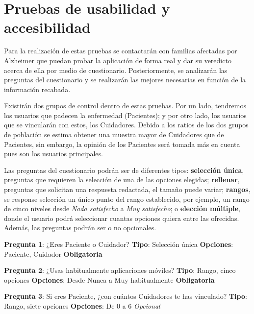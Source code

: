 \section{Pruebas de usabilidad y accesibilidad}
\label{sec:usabilidad_accesibilidad}

Para la realización de estas pruebas se contactarán con familias afectadas por Alzheimer que puedan probar la aplicación de forma real y dar su veredicto acerca de ella por medio de cuestionario. Posteriormente, se analizarán las preguntas del cuestionario y se realizarán las mejores necesarias en función de la información recabada.

Existirán dos grupos de control dentro de estas pruebas. Por un lado, tendremos los usuarios que padecen la enfermedad (Pacientes); y por otro lado, los usuarios que se vincularán con estos, los Cuidadores. Debido a los ratios de los dos grupos de población se estima obtener una muestra mayor de Cuidadores que de Pacientes, sin embargo, la opinión de los Pacientes será tomada más en cuenta pues son los usuarios principales.

Las preguntas del cuestionario podrán ser de diferentes tipos: \textbf{selección única}, preguntas que requieren la selección de una de las opciones elegidas; \textbf{rellenar}, preguntas que solicitan una respuesta redactada, el tamaño puede variar; \textbf{rangos}, se response selección un único punto del rango establecido, por ejemplo, un rango de cinco niveles desde \emph{Nada satisfecho} a \emph{Muy satisfecho}; o \textbf{elección múltiple}, donde el usuario podrá seleccionar cuantas opciones quiera entre las ofrecidas. Además, las preguntas podrán ser o no opcionales.\newline

\textbf{Pregunta 1}: ¿Eres Paciente o Cuidador?\newline
\textbf{Tipo}: Selección única\newline
\textbf{Opciones}: Paciente, Cuidador\newline
\textbf{Obligatoria}

\textbf{Pregunta 2}: ¿Usas habitualmente aplicaciones móviles?\newline
\textbf{Tipo}: Rango, cinco opciones \newline
\textbf{Opciones}: Desde Nunca a Muy habitualmente\newline
\textbf{Obligatoria}

\textbf{Pregunta 3}: Si eres Paciente, ¿con cuántos Cuidadores te has vinculado?\newline
\textbf{Tipo}: Rango, siete opciones\newline
\textbf{Opciones}: De 0 a 6\newline
\emph{Opcional}

